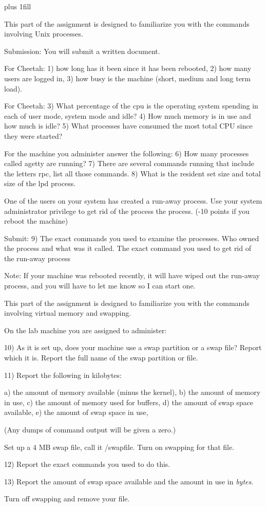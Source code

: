 
\rightskip=0pt plus 1fill

\parindent 0pt

This part of the assignment is designed to familiarize you with the
commands involving Unix processes.

Submission: You will submit a written document.

For Cheetah: 1) how long has it been since it has
been rebooted, 2) how many users are logged in, 3) how busy is the machine
(short, medium and long term load).

For Cheetah: 3) What percentage of the cpu is the operating system
spending in each of user mode, system mode and idle?
4) How much memory is in use and
how much is idle?
5) What processes have consumed the most total CPU since
they were started?

For the machine you administer answer the following:
6) How many processes called {\ltt{}agetty} are running?
7) There are several commands running that include the letters {\ltt{}rpc},
list all those commands.
8) What is the resident set size and total size of the lpd process.

One of the users on your system has created a run-away process.
Use your system administrator privilege to
get rid of the process the process.
(-10 points if you reboot the machine)

Submit: 9) The exact commands you used to examine the processes.
Who owned the process and what was it called.
The exact command you used to get rid of the run-away process

Note: If your machine was rebooted recently, it will have wiped
out the run-away process, and you will have to let me know so
I can start one.

This part of the assignment is designed to familiarize you with the
commands involving virtual memory and swapping.

On the lab machine you are assigned to administer:

10) As it is set up,
does your machine use a swap partition or a swap file? 
Report which it is.
Report the full name of the swap partition or file.

11) Report the following in kilobytes:

a) the amount of memory available (minus the kernel),
\break
b) the amount of memory in use,
\break
c) the amount of memory used for buffers,
\break
d) the amount of swap space available,
\break
e) the amount of swap space in use,

(Any dumps of command output will be given a zero.)

Set up a 4 MB swap file, call it /swapfile.
Turn on swapping for that file.

12) Report the exact commands you used to do this.

13) Report the amount of swap space available and the amount in use in
{\it{}bytes}.

Turn off swapping and remove your file.
\bye
